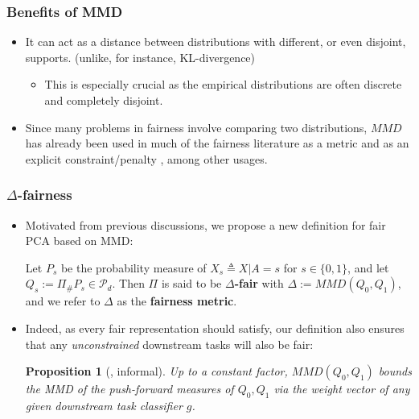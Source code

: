 \documentclass{beamer}
\newtheorem{proposition}{Proposition}
\begin{document}
\begin{frame}
	\frametitle{Benefits of MMD}
	\begin{itemize}
		\item It can act as a distance between distributions with different, or even disjoint, supports. (unlike, for instance, KL-divergence)
		\begin{itemize}
			\item This is especially crucial as the empirical distributions are often discrete and completely disjoint.
		\end{itemize}
		
		\item Since many problems in fairness involve comparing two distributions, $MMD$ has already been used in much of the fairness literature as a metric \cite{Madras18a, Adel19} and as an explicit constraint/penalty \cite{Quadrianto17, Louizos16, Prost19, Oneto20, Jung21}, among other usages.
	\end{itemize}
\end{frame}

\begin{frame}
	\frametitle{$\Delta$-fairness}
	\begin{itemize}
		\item Motivated from previous discussions, we propose a new definition for fair PCA based on MMD:
		\begin{definition}
			\label{def:fairness}
			Let $P_s$ be the probability measure of $X_s \triangleq X | A = s$ for $s \in \{0, 1\}$, and let $Q_s := \Pi_\# P_s \in \mathcal{P}_d$.
			Then $\Pi$ is said to be {\bf $\Delta$-fair} with $\Delta := MMD(Q_0, Q_1)$, and we refer to $\Delta$ as the {\bf fairness metric}.
		\end{definition}
		
		\item Indeed, as every fair representation should satisfy, our definition also ensures that any {\it unconstrained} downstream tasks will also be fair:
		\begin{proposition}[\cite{Oneto20}, informal]
			\label{prop:fair-representation}
			Up to a constant factor, $MMD(Q_0, Q_1)$ bounds the MMD of the push-forward measures of $Q_0, Q_1$ via the weight vector of any given downstream task classifier $g$.
		\end{proposition}
	\end{itemize}
\end{frame}
\end{document}
